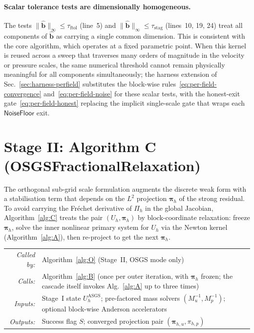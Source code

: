 \documentclass{article}
\makeatletter
\newcommand{\textftol}{\tau_{\mathrm{ftol}}}
\newcommand{\textstag}{\tau_{\mathrm{stag}}}
\newcommand{\moduleinterface}[4]{%
\begin{interfacecard}
\footnotesize
\begin{tabular}{@{}r@{\quad}p{0.82\textwidth}@{}}
\textit{Called by:} & #1 \\
\textit{Calls:}     & #2 \\
\textit{Inputs:}    & #3 \\
\textit{Outputs:}   & #4 \\
\end{tabular}
\end{interfacecard}
}
\makeatother
\begin{document}
\paragraph{Scalar tolerance tests are dimensionally homogeneous.}
The tests $\|\hat{\boldsymbol{b}}\|_{\infty}\le\textftol$ (line~5)
and $\|\hat{\boldsymbol{b}}\|_{\infty}\le\textstag$ (lines~10, 19, 24)
treat all components of $\hat{\boldsymbol{b}}$ as carrying a single
common dimension. This is consistent with the core algorithm, which
operates at a fixed parametric point. When this kernel is reused
across a sweep that traverses many orders of magnitude in the
velocity or pressure scales, the same numerical threshold cannot
remain physically meaningful for all components simultaneously; the
harness extension of Sec.~\ref{sec:harness-perfield} substitutes the
block-wise rules~\eqref{eq:per-field-convergence}
and~\eqref{eq:per-field-noise} for these scalar tests, with the
honest-exit gate~\eqref{eq:per-field-honest} replacing the implicit
single-scale gate that wraps each $\mathsf{NoiseFloor}$ exit.

\section{Stage II: Algorithm C (OSGSFractionalRelaxation)}
\label{sec:osgs}

The orthogonal sub-grid scale formulation augments the discrete weak
form with a stabilisation term that depends on the $L^2$ projection
$\boldsymbol{\pi}_h$ of the strong residual. To avoid carrying the
Fr\'echet derivative of $\Pi_h$ in the global Jacobian,
Algorithm~\ref{alg:C} treats the pair $(U_h, \boldsymbol{\pi}_h)$ by
block-coordinate relaxation: freeze $\boldsymbol{\pi}_h$, solve the
inner nonlinear primary system for $U_h$ via the Newton kernel
(Algorithm~\ref{alg:A}), then re-project to get the next
$\boldsymbol{\pi}_h$.

\moduleinterface
    {Algorithm~\ref{alg:O} (Stage~II, OSGS mode only)}
    {Algorithm~\ref{alg:B} (once per outer iteration, with $\boldsymbol{\pi}_h$ frozen; the cascade itself invokes Alg.~\ref{alg:A} up to three times)}
    {Stage~I state $U_h^{\mathrm{ASGS}}$; pre-factored mass solvers $(M_u^{-1}, M_p^{-1})$; optional block-wise Anderson accelerators}
    {Success flag $S$; converged projection pair $(\boldsymbol{\pi}_{h,u}, \pi_{h,p})$}
\end{document}
